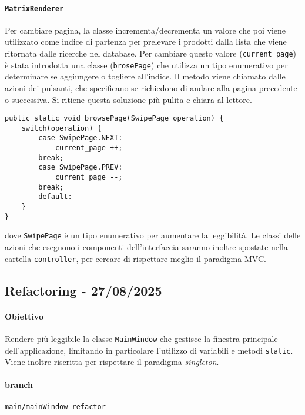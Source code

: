 \documentclass{article}
\begin{document}
\paragraph{\texttt{MatrixRenderer}} Per cambiare pagina, la classe incrementa/decrementa un valore che poi viene utilizzato come indice di partenza per prelevare i prodotti dalla lista che viene ritornata dalle ricerche nel database. Per cambiare questo valore (\texttt{current\_page}) è stata introdotta una classe (\texttt{brosePage}) che utilizza un tipo enumerativo per determinare se aggiungere o togliere all'indice. Il metodo viene chiamato dalle azioni dei pulsanti, che specificano se richiedono di andare alla pagina precedente o successiva. Si ritiene questa soluzione più pulita e chiara al lettore. 
\begin{code*}{}
\begin{verbatim}
public static void browsePage(SwipePage operation) {
    switch(operation) {
        case SwipePage.NEXT:
            current_page ++;
        break;
        case SwipePage.PREV:
            current_page --;
        break;
        default:
    }    
}
\end{verbatim}
\end{code*}
dove \texttt{SwipePage} è un tipo enumerativo per aumentare la leggibilità. Le classi delle azioni che eseguono i componenti dell'interfaccia saranno inoltre spostate nella cartella \texttt{controller}, per cercare di rispettare meglio il paradigma MVC. 


\subsection{Refactoring - 27/08/2025}
\paragraph{Obiettivo} Rendere più leggibile la classe \texttt{MainWindow} che gestisce la finestra principale dell'applicazione, limitando in particolare l'utilizzo di variabili e metodi \texttt{static}. Viene inoltre riscritta per rispettare il paradigma \textit{singleton}. 
\paragraph{branch} 
\begin{code*}{}
\begin{center}
\texttt{main/mainWindow-refactor}
\end{center}
\end{code*}
\end{document}
